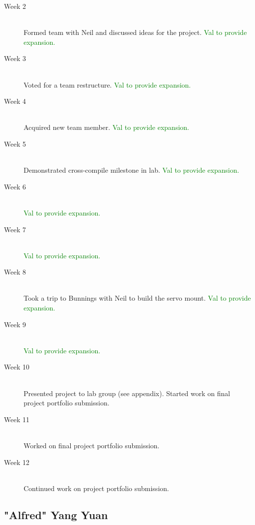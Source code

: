 \documentclass[11pt,a4paper,titlepage]{report}
\begin{document}
\begin{description}

  \item[Week 2] \hfill \\
      Formed team with Neil and discussed ideas for the project. \textcolor{green}{Val to provide expansion.}
  \item[Week 3] \hfill \\
      Voted for a team restructure. \textcolor{green}{Val to provide expansion.}
  \item[Week 4] \hfill \\
      Acquired new team member. \textcolor{green}{Val to provide expansion.}
  \item[Week 5] \hfill \\
      Demonstrated cross-compile milestone in lab. \textcolor{green}{Val to provide expansion.}
  \item[Week 6] \hfill \\
      \textcolor{green}{Val to provide expansion.}
  \item[Week 7] \hfill \\
       \textcolor{green}{Val to provide expansion.}
  \item[Week 8] \hfill \\
      Took a trip to Bunnings with Neil to build the servo mount. \textcolor{green}{Val to provide expansion.}
  \item[Week 9] \hfill \\
       \textcolor{green}{Val to provide expansion.}
  \item[Week 10] \hfill \\
      Presented project to lab group (see appendix). Started work on final project portfolio submission.
  \item[Week 11] \hfill \\
      Worked on final project portfolio submission.
  \item[Week 12] \hfill \\
      Continued work on project portfolio submission.

\end{description}


\subsection{"Alfred" Yang Yuan}
\end{document}
